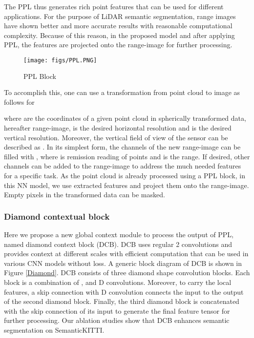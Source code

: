 \documentclass{article}
\begin{document}
  The PPL thus generates rich point features that can be used for different applications. For the purpose of LiDAR semantic segmentation, range images have shown better and more accurate results with reasonable computational complexity. Because of this reason, in the proposed model and after applying PPL, the features are projected onto the range-image for further processing.
 
  \begin{figure*}[!htbp]
    \centering
    \texttt{[image: figs/PPL.PNG]}
    \caption[PPL]{PPL Block}
    \label{PPL}
\end{figure*}
To accomplish this, one can use a transformation from point cloud to image as follows for 

    
    
 where  are the coordinates of a given point cloud  in spherically transformed data, hereafter range-image,  is the desired horizontal resolution and  is the desired vertical resolution. Moreover, the vertical field of view of the sensor can be described as . In its simplest form, the channels of the new range-image can be filled with , where  is remission reading of points and  is the range. If desired, other channels can be added to the range-image to address the much needed features for a specific task. As the point cloud is already processed using a PPL block, in this NN model, we use extracted features  and project them onto the range-image. Empty pixels in the transformed data can be masked.
 
 \subsubsection{Diamond contextual block}
 \label{sec:diamond}
 Here we propose a new global context module to process the output of PPL, named diamond context block (DCB). DCB uses regular 2 convolutions and provides context at different scales with efficient computation that can be used in various CNN models without loss. A generic block diagram of DCB is shown in Figure \ref{Diamond}. DCB consists of three diamond shape convolution blocks. Each block is a combination of ,  and  D convolutions. Moreover, to carry the local features, a skip connection with  D convolution connects the input to the output of the second diamond block. Finally, the third diamond block is concatenated with the skip connection of its input to generate the final feature tensor for further processing. Our ablation studies show that DCB enhances semantic segmentation on SemanticKITTI.
\end{document}
